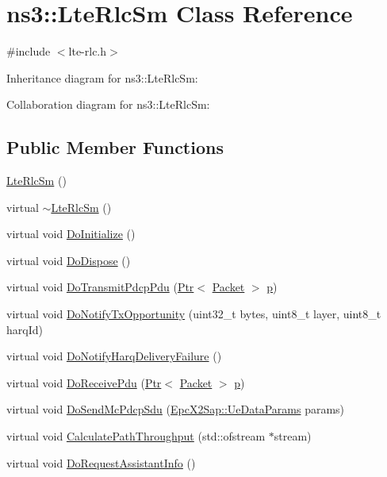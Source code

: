 \hypertarget{classns3_1_1LteRlcSm}{}\section{ns3\+:\+:Lte\+Rlc\+Sm Class Reference}
\label{classns3_1_1LteRlcSm}


{\ttfamily \#include $<$lte-\/rlc.\+h$>$}



Inheritance diagram for ns3\+:\+:Lte\+Rlc\+Sm\+:


Collaboration diagram for ns3\+:\+:Lte\+Rlc\+Sm\+:
\subsection*{Public Member Functions}
\begin{DoxyCompactItemize}
\item 
\hyperlink{classns3_1_1LteRlcSm_a61f85b0268a2f5c7b3aa79bf8a7dfdf8}{Lte\+Rlc\+Sm} ()
\item 
virtual \hyperlink{classns3_1_1LteRlcSm_aa7ade9ea1c1229ef8e6da3d910896f27}{$\sim$\+Lte\+Rlc\+Sm} ()
\item 
virtual void \hyperlink{classns3_1_1LteRlcSm_a81f1a5a4ee2d5d46511a4648a9e23297}{Do\+Initialize} ()
\item 
virtual void \hyperlink{classns3_1_1LteRlcSm_a027665e3a3d094950b7cf0b39fb9755f}{Do\+Dispose} ()
\item 
virtual void \hyperlink{classns3_1_1LteRlcSm_a4cdef3152e9bfce674efbccf199b6c00}{Do\+Transmit\+Pdcp\+Pdu} (\hyperlink{classns3_1_1Ptr}{Ptr}$<$ \hyperlink{classns3_1_1Packet}{Packet} $>$ \hyperlink{lte__link__budget__x2__handover__measures_8m_ac9de518908a968428863f829398a4e62}{p})
\item 
virtual void \hyperlink{classns3_1_1LteRlcSm_a35851c2c4b5efc366a280855750300b8}{Do\+Notify\+Tx\+Opportunity} (uint32\+\_\+t bytes, uint8\+\_\+t layer, uint8\+\_\+t harq\+Id)
\item 
virtual void \hyperlink{classns3_1_1LteRlcSm_aa259688b6de2bc29668510bb176491b9}{Do\+Notify\+Harq\+Delivery\+Failure} ()
\item 
virtual void \hyperlink{classns3_1_1LteRlcSm_a4844e545ebe665d78afafc82a6d22800}{Do\+Receive\+Pdu} (\hyperlink{classns3_1_1Ptr}{Ptr}$<$ \hyperlink{classns3_1_1Packet}{Packet} $>$ \hyperlink{lte__link__budget__x2__handover__measures_8m_ac9de518908a968428863f829398a4e62}{p})
\item 
virtual void \hyperlink{classns3_1_1LteRlcSm_a73e9412992eb841f93bedd4836b305d8}{Do\+Send\+Mc\+Pdcp\+Sdu} (\hyperlink{structns3_1_1EpcX2Sap_1_1UeDataParams}{Epc\+X2\+Sap\+::\+Ue\+Data\+Params} params)
\item 
virtual void \hyperlink{classns3_1_1LteRlcSm_aaa49d8c1327f5474023f5ffb4ca7f53d}{Calculate\+Path\+Throughput} (std\+::ofstream $\ast$stream)
\item 
virtual void \hyperlink{classns3_1_1LteRlcSm_a3b8b0adf5baff9a428a8ddc7656b7ec4}{Do\+Request\+Assistant\+Info} ()
\end{DoxyCompactItemize}

